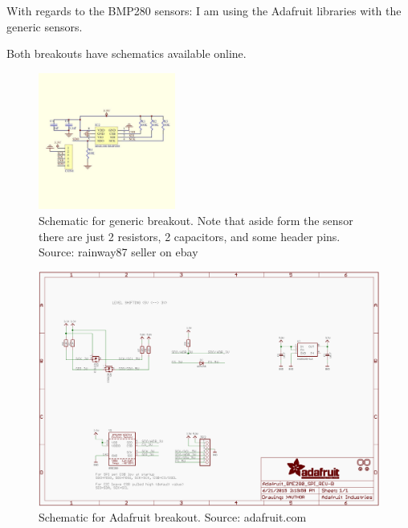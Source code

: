 \documentclass[preprint,12pt,3p]{elsarticle}
\begin{document}
With regards to the BMP280 sensors: I am using the Adafruit libraries with the
generic sensors.

Both breakouts have schematics available online.

\begin{figure}[H]
\centering
\includegraphics[width=0.4\textwidth]{images/sensor/generic_breakout_schematic.jpg}
\caption{Schematic for generic breakout. Note that aside form the sensor there
are just 2 resistors, 2 capacitors, and some header pins. Source: rainway87
seller on ebay}
\end{figure}


\begin{figure}
\centering
\includegraphics[width=\textwidth]{images/sensor/adafruit_breakout_schematic.png}
\caption{Schematic for Adafruit breakout. Source: adafruit.com}
\end{figure}


%

%
\end{document}
